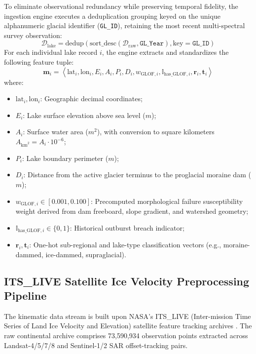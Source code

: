 \documentclass{mnnit}
\begin{document}
To eliminate observational redundancy while preserving temporal fidelity, the ingestion engine executes a deduplication grouping keyed on the unique alphanumeric glacial identifier (\texttt{GL\_ID}), retaining the most recent multi-spectral survey observation:
\begin{equation}
    \mathcal{D}_{\text{lake}} = \text{dedup}\left(\text{sort\_desc}\left(\mathcal{D}_{\text{raw}}, \texttt{GL\_Year}\right), \text{key} = \texttt{GL\_ID}\right)
\end{equation}
For each individual lake record $i$, the engine extracts and standardizes the following feature tuple:
\begin{equation}
    \mathbf{m}_i = \left\langle \text{lat}_i, \text{lon}_i, E_i, A_i, P_i, D_i, w_{\text{GLOF}, i}, \mathbb{I}_{\text{has\_GLOF}, i}, \mathbf{r}_i, \mathbf{t}_i \right\rangle
\end{equation}
where:
\begin{itemize}
    \item $\text{lat}_i, \text{lon}_i$: Geographic decimal coordinates;
    \item $E_i$: Lake surface elevation above sea level ($m$);
    \item $A_i$: Surface water area ($m^2$), with conversion to square kilometers $A_{\text{km}^2} = A_i \cdot 10^{-6}$;
    \item $P_i$: Lake boundary perimeter ($m$);
    \item $D_i$: Distance from the active glacier terminus to the proglacial moraine dam ($m$);
    \item $w_{\text{GLOF}, i} \in [0.001, 0.100]$: Precomputed morphological failure susceptibility weight derived from dam freeboard, slope gradient, and watershed geometry;
    \item $\mathbb{I}_{\text{has\_GLOF}, i} \in \{0, 1\}$: Historical outburst breach indicator;
    \item $\mathbf{r}_i, \mathbf{t}_i$: One-hot sub-regional and lake-type classification vectors (e.g., moraine-dammed, ice-dammed, supraglacial).
\end{itemize}

\subsection{ITS\_LIVE Satellite Ice Velocity Preprocessing Pipeline}
The kinematic data stream is built upon NASA's ITS\_LIVE (Inter-mission Time Series of Land Ice Velocity and Elevation) satellite feature tracking archives \cite{gardner2018itslive}. The raw continental archive comprises 73,590,934 observation points extracted across Landsat-4/5/7/8 and Sentinel-1/2 SAR offset-tracking pairs.
\end{document}
